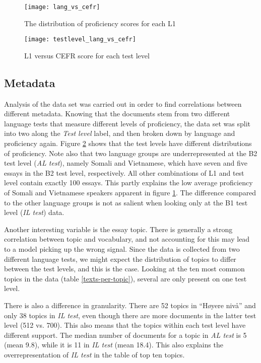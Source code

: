 \begin{figure}
  \centering
  \texttt{[image: lang\_vs\_cefr]}
  \caption{The distribution of proficiency scores for each L1}
  \label{lang-vs-cefr}
\end{figure}
 
\begin{figure}
  \centering
  \texttt{[image: testlevel\_lang\_vs\_cefr]}
  \caption{L1 versus CEFR score for each test level}
  \label{testlevel-lang-vs-cefr}
\end{figure}
 
\subsection{Metadata}

Analysis of the data set was carried out in order to find correlations
between different metadata. Knowing that the documents stem from two
different language tests that measure different levels of proficiency, the
data set was split into two along the \emph{Test level} label, and then broken
down by language and proficiency again. Figure \ref{testlevel-lang-vs-cefr}
shows that the test levels have different distributions of proficiency. Note
also that two language groups are underrepresented at the B2 test level
(\emph{AL test}), namely Somali and Vietnamese, which have seven and five
essays in the B2 test level, respectively. All other combinations of L1 and
test level contain exactly 100 essays. This partly explains the low average
proficiency of Somali and Vietnamese speakers apparent in figure
\ref{lang-vs-cefr}. The difference compared to the other language groups is
not as salient when looking only at the B1 test level (\emph{IL test}) data.

Another interesting variable is the essay topic. There is generally a strong
correlation between topic and vocabulary, and not accounting for this may
lead to a model picking up the wrong signal. Since the data is collected from
two different language tests, we might expect the distribution of topics to
differ between the test levels, and this is the case. Looking at the ten most
common topics in the data (table \ref{texts-per-topic}), several are only
present on one test level.

There is also a difference in granularity. There are 52 topics in ``Høyere
nivå'' and only 38 topics in \emph{IL test}, even though there are more
documents in the latter test level (512 vs. 700). This also means that the
topics within each test level have different support. The median number of
documents for a topic in \emph{AL test} is 5 (mean 9.8), while it is 11 in
\emph{IL test} (mean 18.4). This also explains the overrepresentation of
\emph{IL test} in the table of top ten topics.

